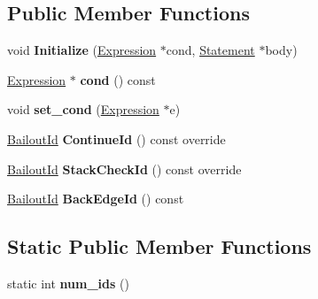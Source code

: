 \subsection*{Public Member Functions}
\begin{DoxyCompactItemize}
\item 
void {\bfseries Initialize} (\hyperlink{classv8_1_1internal_1_1_expression}{Expression} $\ast$cond, \hyperlink{classv8_1_1internal_1_1_statement}{Statement} $\ast$body)\hypertarget{classv8_1_1internal_1_1_do_while_statement_a2e4030933fc34777c59bdbc625d87431}{}\label{classv8_1_1internal_1_1_do_while_statement_a2e4030933fc34777c59bdbc625d87431}

\item 
\hyperlink{classv8_1_1internal_1_1_expression}{Expression} $\ast$ {\bfseries cond} () const \hypertarget{classv8_1_1internal_1_1_do_while_statement_a773835a528b67cf48517af219e2efa5c}{}\label{classv8_1_1internal_1_1_do_while_statement_a773835a528b67cf48517af219e2efa5c}

\item 
void {\bfseries set\+\_\+cond} (\hyperlink{classv8_1_1internal_1_1_expression}{Expression} $\ast$e)\hypertarget{classv8_1_1internal_1_1_do_while_statement_a957e0decb2b7880f128ede048dc7be70}{}\label{classv8_1_1internal_1_1_do_while_statement_a957e0decb2b7880f128ede048dc7be70}

\item 
\hyperlink{classv8_1_1internal_1_1_bailout_id}{Bailout\+Id} {\bfseries Continue\+Id} () const  override\hypertarget{classv8_1_1internal_1_1_do_while_statement_adf95989276b90fe26ea87139f98c4fb9}{}\label{classv8_1_1internal_1_1_do_while_statement_adf95989276b90fe26ea87139f98c4fb9}

\item 
\hyperlink{classv8_1_1internal_1_1_bailout_id}{Bailout\+Id} {\bfseries Stack\+Check\+Id} () const  override\hypertarget{classv8_1_1internal_1_1_do_while_statement_a8c7769ceff8ca7da7744db27586fe825}{}\label{classv8_1_1internal_1_1_do_while_statement_a8c7769ceff8ca7da7744db27586fe825}

\item 
\hyperlink{classv8_1_1internal_1_1_bailout_id}{Bailout\+Id} {\bfseries Back\+Edge\+Id} () const \hypertarget{classv8_1_1internal_1_1_do_while_statement_a75e84a60913c9c756f90e67d2546faab}{}\label{classv8_1_1internal_1_1_do_while_statement_a75e84a60913c9c756f90e67d2546faab}

\end{DoxyCompactItemize}
\subsection*{Static Public Member Functions}
\begin{DoxyCompactItemize}
\item 
static int {\bfseries num\+\_\+ids} ()\hypertarget{classv8_1_1internal_1_1_do_while_statement_aac40021687d6130be1019807c9d49eff}{}\label{classv8_1_1internal_1_1_do_while_statement_aac40021687d6130be1019807c9d49eff}

\end{DoxyCompactItemize}
